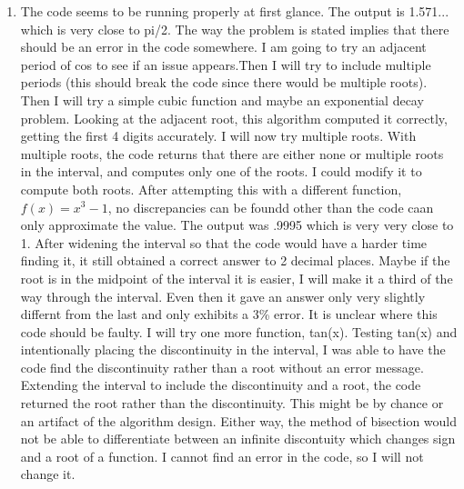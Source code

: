 \documentclass[11pt]{article}
\begin{document}
\begin{enumerate}
\begin{enumerate}
    \item The code seems to be running properly at first glance. The output is 1.571... which is very close to pi/2. The way the problem is stated implies that there should be an error in the code somewhere. I am going to try an adjacent period of cos to see if an issue appears.Then I will try to include multiple periods (this should break the code since there would be multiple roots). Then I will try a simple cubic function and maybe an exponential decay problem. Looking at the adjacent root, this algorithm computed it correctly, getting the first 4 digits accurately. I will now try multiple roots. With multiple roots, the code returns that there are either none or multiple roots in the interval, and computes only one of the roots. I could modify it to compute both roots. After attempting this with a different function, $f(x) = x^3 - 1$, no discrepancies can be foundd other than the code caan only approximate the value. The output was .9995 which is very very close to 1. After widening the interval so that the code would have a harder time finding it, it still obtained a correct answer to 2 decimal places. Maybe if the root is in the midpoint of the interval it is easier, I will make it a third of the way through the interval. Even then it gave an answer only very slightly differnt from the last and only exhibits a 3\% error. It is unclear where this code should be faulty. I will try one more function, tan(x). Testing tan(x) and intentionally placing the discontinuity in the interval, I was able to have the code find the discontinuity rather than a root without an error message. Extending the interval to include the discontinuity and a root, the code returned the root rather than the discontinuity. This might be by chance or an artifact of the algorithm design. Either way, the method of bisection would not be able to differentiate between an infinite discontuity which changes sign and a root of a function. I cannot find an error in the code, so I will not change it. 

\end{enumerate}


\end{enumerate}
\end{document}
